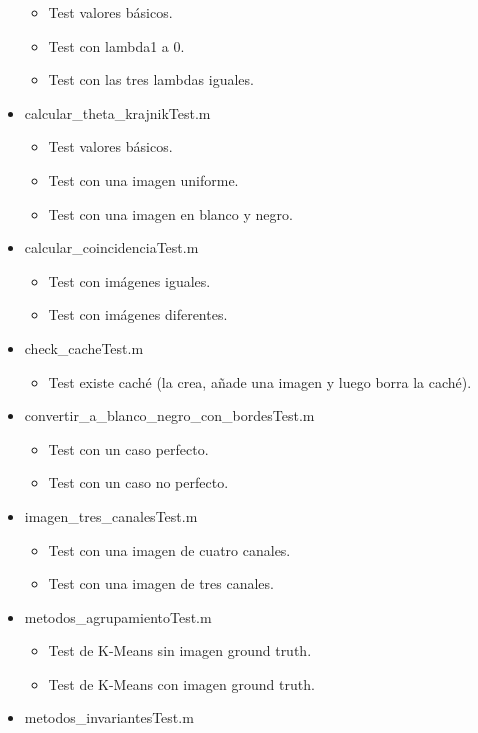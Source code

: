 \begin{itemize}
\begin{itemize}
        \item Test valores básicos.
        \item Test con lambda1 a 0.
        \item Test con las tres lambdas iguales.
    \end{itemize}
    \item calcular\_theta\_krajnikTest.m
    \begin{itemize}
        \item Test valores básicos.
        \item Test con una imagen uniforme.
        \item Test con una imagen en blanco y negro.
    \end{itemize}
    \item calcular\_coincidenciaTest.m
    \begin{itemize}
        \item Test con imágenes iguales.
        \item Test con imágenes diferentes.
    \end{itemize}
    \item check\_cacheTest.m
    \begin{itemize}
        \item Test existe caché (la crea, añade una imagen y luego borra la caché).
    \end{itemize}
    \item convertir\_a\_blanco\_negro\_con\_bordesTest.m
    \begin{itemize}
        \item Test con un caso perfecto.
        \item Test con un caso no perfecto.
    \end{itemize}
    \item imagen\_tres\_canalesTest.m
    \begin{itemize}
        \item Test con una imagen de cuatro canales.
        \item Test con una imagen de tres canales.
    \end{itemize}
    \item metodos\_agrupamientoTest.m
    \begin{itemize}
        \item Test de K-Means sin imagen ground truth.
        \item Test de K-Means con imagen ground truth.
    \end{itemize}
    \item metodos\_invariantesTest.m

\end{itemize}
